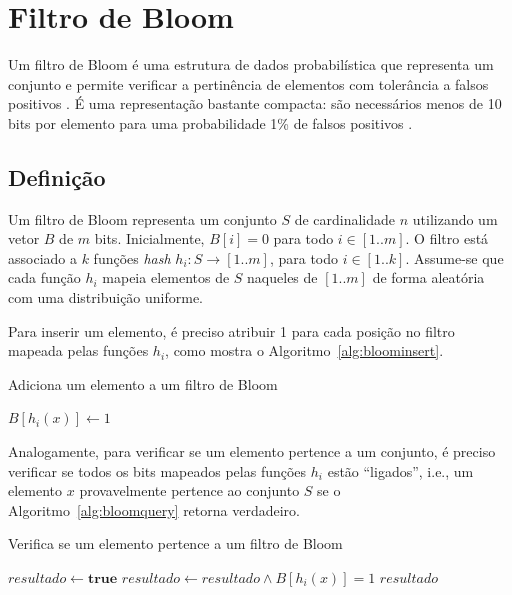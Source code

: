 \section{Filtro de Bloom}\label{sec:bloom}

Um filtro de Bloom é uma estrutura de dados probabilística que representa um conjunto e permite verificar a pertinência de elementos com tolerância a falsos positivos \cite{bloom1970space}. É uma representação bastante compacta: são necessários menos de 10 bits por elemento para uma probabilidade 1\% de falsos positivos \cite{bonomi2006improved}. 

\subsection{Definição}\label{sec:bloom:def}

Um filtro de Bloom representa um conjunto $S$ de cardinalidade $n$ utilizando um vetor $B$ de $m$ bits. Inicialmente, $B[i] = 0$ para todo $i \in [1..m]$. O filtro está associado a $k$ funções \emph{hash} $h_i : S \rightarrow [1..m]$, para todo $i \in [1..k]$. Assume-se que cada função $h_i$ mapeia elementos de $S$ naqueles de $[1..m]$ de forma aleatória com uma distribuição uniforme.

Para inserir um elemento, é preciso atribuir 1 para cada posição no filtro mapeada pelas funções $h_i$, como mostra o Algoritmo~\ref{alg:bloominsert}.

\begin{algorithm}
\linespread{1}\selectfont
\caption{Adiciona um elemento a um filtro de Bloom}
\label{alg:bloominsert}
\begin{algorithmic}[1]
        \State $B[h_i(x)] \gets 1$
	\EndFor
\EndProcedure
\end{algorithmic}
\end{algorithm}

Analogamente, para verificar se um elemento pertence a um conjunto, é preciso verificar se todos os bits mapeados pelas funções $h_i$ estão ``ligados'', i.e., um elemento $x$ provavelmente pertence ao conjunto $S$ se o Algoritmo~\ref{alg:bloomquery} retorna verdadeiro.

\begin{algorithm}
\linespread{1}\selectfont
\caption{Verifica se um elemento pertence a um filtro de Bloom}
\label{alg:bloomquery}
\begin{algorithmic}[1]
    \State $resultado \gets \textbf{true}$ 
        \State $resultado \gets resultado \land B[h_i(x)] = 1$
	\EndFor
	\Return $resultado$
\EndFunction
\end{algorithmic}
\end{algorithm}

